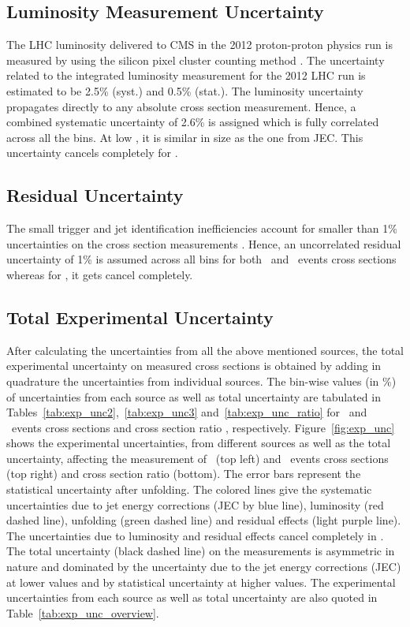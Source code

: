 \subsection{Luminosity Measurement Uncertainty}
The LHC luminosity delivered to CMS in the 2012 proton-proton physics run is measured  by using the silicon pixel cluster counting method \cite{CMS:2013gfa}. The uncertainty related to the integrated luminosity measurement for the 2012 LHC run is estimated to be 2.5\% (syst.) and 0.5\% (stat.). The luminosity uncertainty propagates directly to any absolute cross section measurement. Hence, a combined systematic uncertainty of 2.6\% is assigned which is fully correlated across all the \httwo bins. At low \httwons, it is similar in size as the one from JEC. This uncertainty cancels completely for \ratio.

\subsection{Residual Uncertainty}
The small trigger and jet identification inefficiencies account for smaller than 1\% uncertainties on the cross section measurements \cite{Chatrchyan:2012bja,Khachatryan:2016mlc}. Hence, an uncorrelated residual uncertainty of 1\% is assumed across all \httwo bins for both \njt~and \njth~events cross sections whereas for \ratio, it gets cancel completely.

\subsection{Total Experimental Uncertainty}
After calculating the uncertainties from all the above mentioned sources, the total experimental uncertainty on measured cross sections is obtained by adding in quadrature the uncertainties from individual sources. The bin-wise values (in \%) of uncertainties from each source as well as total uncertainty are tabulated in Tables~\ref{tab:exp_unc2},~\ref{tab:exp_unc3} and~\ref{tab:exp_unc_ratio} for \njt~and \njth~events cross sections and cross section ratio \ratio, respectively. Figure~\ref{fig:exp_unc} shows the experimental uncertainties, from different sources as well as the total uncertainty, affecting the measurement of \njt~(top left) and \njth~events cross sections (top right) and cross section ratio \ratio (bottom). The error bars represent the statistical uncertainty after unfolding. The colored lines give the systematic uncertainties due to jet energy corrections (JEC by blue line), luminosity (red dashed line), unfolding (green dashed line) and residual effects (light purple line). The uncertainties due to luminosity and residual effects cancel completely in \ratio. The total uncertainty (black dashed line) on the measurements is asymmetric in nature and dominated by the uncertainty due to the jet energy corrections (JEC) at lower \httwo values and by statistical uncertainty at higher \httwo values. The experimental uncertainties from each source as well as total uncertainty are also quoted in Table~\ref{tab:exp_unc_overview}. 

